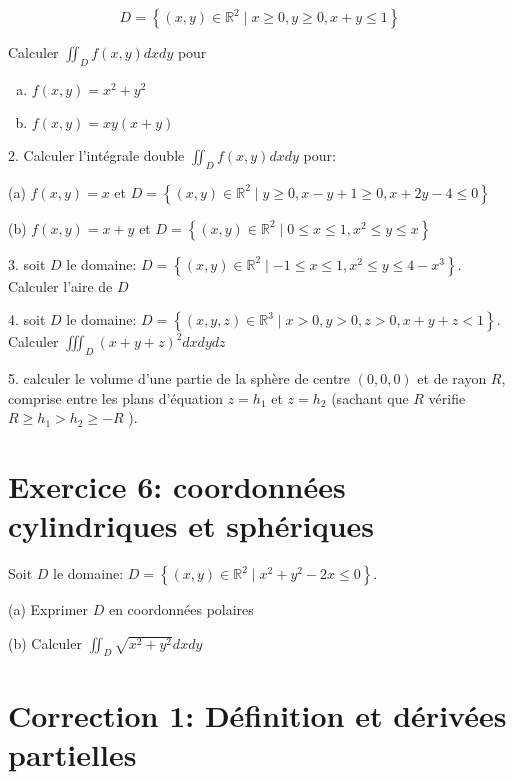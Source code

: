 $$
D=\left\{(x, y) \in \mathbb{R}^2 \mid x \geq 0, y \geq 0, x+y \leq 1\right\}
$$


Calculer $\iint_D f(x, y) d x d y$ pour
\begin{enumerate}[a)]
    \item  $f(x, y)=x^2+y^2$
    \item $f(x, y)=x y(x+y)$
\end{enumerate}


2. Calculer l'intégrale double $\iint_D f(x, y) d x d y$ pour:

(a) $f(x, y)=x$ et $D=\left\{(x, y) \in \mathbb{R}^2 \mid y \geq 0, x-y+1 \geq 0, x+2 y-4 \leq 0\right\}$

(b) $f(x, y)=x+y$ et $D=\left\{(x, y) \in \mathbb{R}^2 \mid 0 \leq x \leq 1, x^2 \leq y \leq x\right\}$

3. soit $D$ le domaine: $D=\left\{(x, y) \in \mathbb{R}^2 \mid-1 \leq x \leq 1, x^2 \leq y \leq 4-x^3\right\}$. Calculer l'aire de $D$

4. soit $D$ le domaine: $D=\left\{(x, y, z) \in \mathbb{R}^3 \mid x>0, y>0, z>0, x+y+z<1\right\}$. Calculer $\iiint_D(x+y+z)^2 d x d y d z$

5. calculer le volume d'une partie de la sphère de centre $(0,0,0)$ et de rayon $R$, comprise entre les plans d'équation $z=h_1$ et $z=h_2$ (sachant que $R$ vérifie $R \geq h_1>h_2 \geq-R$ ).

\section*{Exercice 6: coordonnées cylindriques et sphériques}


Soit $D$ le domaine: $D=\left\{(x, y) \in \mathbb{R}^2 \mid x^2+y^2-2 x \leq 0\right\}$.

(a) Exprimer $D$ en coordonnées polaires

(b) Calculer $\iint_D \sqrt{x^2+y^2} d x d y$


\section*{Correction 1: Définition et dérivées partielles}

